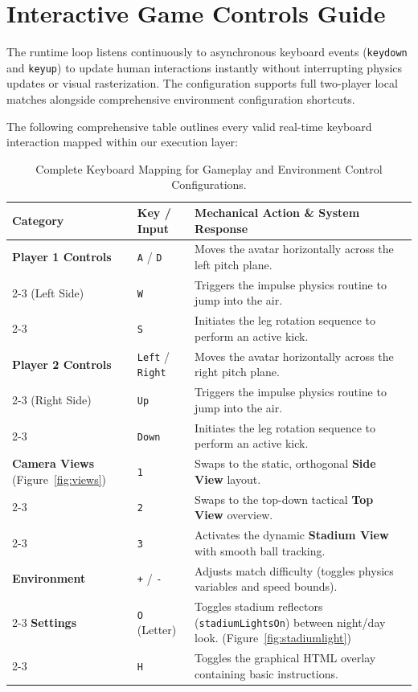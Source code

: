 \section{Interactive Game Controls Guide}
The runtime loop listens continuously to asynchronous keyboard events (\texttt{keydown} and \texttt{keyup}) to update human interactions instantly without interrupting physics updates or visual rasterization. The configuration supports full two-player local matches alongside comprehensive environment configuration shortcuts.

The following comprehensive table outlines every valid real-time keyboard interaction mapped within our execution layer:

\begin{table}[h!]
\centering
\small
\renewcommand{\arraystretch}{1.4}
\begin{tabular}{|l|l|p{7.5cm}|}
\hline
\textbf{Category} & \textbf{Key / Input} & \textbf{Mechanical Action \& System Response} \\ \hline
\hline
\textbf{Player 1 Controls} & \texttt{A} / \texttt{D} & Moves the avatar horizontally across the left pitch plane. \\ \cline{2-3}
(Left Side) & \texttt{W} & Triggers the impulse physics routine to jump into the air. \\ \cline{2-3}
 & \texttt{S} & Initiates the leg rotation sequence to perform an active kick. \\ \hline
\hline
\textbf{Player 2 Controls} & \texttt{Left} / \texttt{Right} & Moves the avatar horizontally across the right pitch plane. \\ \cline{2-3}
(Right Side) & \texttt{Up} & Triggers the impulse physics routine to jump into the air. \\ \cline{2-3}
 & \texttt{Down} & Initiates the leg rotation sequence to perform an active kick. \\ \hline
\hline
\textbf{Camera Views} (Figure~\ref{fig:views}) & \texttt{1} & Swaps to the static, orthogonal \textbf{Side View} layout. \\ \cline{2-3}
 & \texttt{2} & Swaps to the top-down tactical \textbf{Top View} overview. \\ \cline{2-3}
 & \texttt{3} & Activates the dynamic \textbf{Stadium View} with smooth ball tracking. \\ \hline
\hline
\textbf{Environment} & \texttt{+} / \texttt{-} & Adjusts match difficulty (toggles physics variables and speed bounds). \\ \cline{2-3}
\textbf{Settings} & \texttt{O} (Letter) & Toggles stadium reflectors (\texttt{stadiumLightsOn}) between night/day look. (Figure~\ref{fig:stadiumlight})\\ \cline{2-3}
 & \texttt{H} & Toggles the graphical HTML overlay containing basic instructions. \\ \hline
\end{tabular}
\caption{Complete Keyboard Mapping for Gameplay and Environment Control Configurations.}
\label{tab:game_controls}
\end{table}

